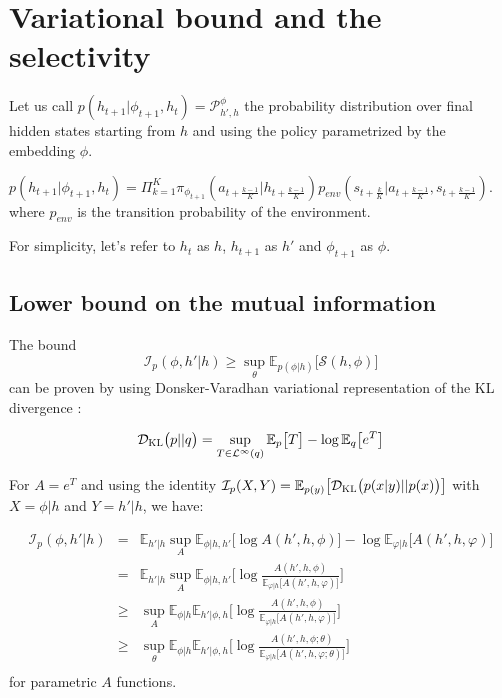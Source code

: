 \section{Variational bound and the selectivity}
\label{appendix:bound}
% 
Let us call $p(h_{t+1} | \phi_{t+1}, h_t) =  \mathcal{P}^\phi_{h' ,h}$ the probability distribution over final hidden states starting from $h$ and using the policy parametrized by the embedding $\phi$.

$p(h_{t+1} | \phi_{t+1}, h_t) = \Pi_{k=1}^{K}  \pi_{\phi_{t+1}}( a_{t+\frac{k-1}{K}} | h_{t+\frac{k-1}{K}}) p_{env}(s_{t+\frac{k}{K}} | a_{t+\frac{k-1}{K}}, s_{t+\frac{k-1}{K}})$.
where $p_{env}$ is the transition probability of the environment.

For simplicity, let's refer to $h_t$ as $h$, $h_{t+1}$ as $h'$ and $\phi_{t+1}$ as $\phi$.
\subsection{Lower bound on the mutual information}
The bound $$\mathcal{I}_p(\phi, h' | h) \ge \sup_\theta  \mathbb{E}_{p(\phi|h)} \big[ \mathcal{S}(h, \phi)\big]$$ can be proven by using Donsker-Varadhan variational representation of the KL divergence \citep{donsker1975asymptotic,ruderman2012tighter}:

$${\mathcal{D}}_{\textsc{KL}}\big(p||q\big) = \sup_{T \in \mathcal{L}^\infty(q)} \mathbb{E}_p \big[ T  \big] - \log \mathbb{E}_q \big[ e^T \big]$$

For $A = e^T$ and using the identity $\mathcal{I}_p(X, Y) = \mathbb{E}_{p(y)} \big[ {\mathcal{D}}_{\textsc{KL}}\big(p(x|y)||p(x)\big)\big]$ with $X=\phi|h$ and $Y=h'|h$, we have:

\begin{eqnarray*}
\mathcal{I}_p(\phi, h' | h) &=& \mathbb{E}_{h'|h} \sup_A \mathbb{E}_{\phi|h, h'} \big[ \log A(h', h, \phi) \big] - \log \mathbb{E}_{\varphi|h} \big[ A(h', h, \varphi) \big]\\
&=& \mathbb{E}_{h'|h} \sup_A \mathbb{E}_{\phi|h, h'} \big[ \log \frac{ A(h', h, \phi)}{\mathbb{E}_{\varphi|h} \big[ A(h', h, \varphi)\big]}\big]\\
&\ge&  \sup_A \mathbb{E}_{\phi|h}\mathbb{E}_{h'|\phi, h} \big[ \log \frac{ A(h', h, \phi)}{\mathbb{E}_{\varphi|h} \big[ A(h', h, \varphi)\big]}\big]\\
&\ge&  \sup_\theta \mathbb{E}_{\phi|h}\mathbb{E}_{h'|\phi, h} \big[ \log \frac{ A(h', h, \phi; \theta)}{\mathbb{E}_{\varphi|h} \big[ A(h', h, \varphi; \theta)\big]}\big]\\
\end{eqnarray*}
for parametric $A$ functions.

